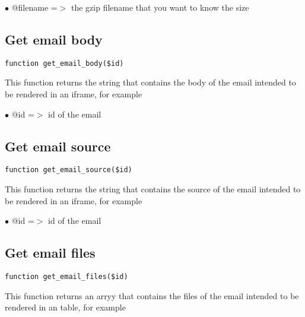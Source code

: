 \documentclass[a4paper]{book}
\begin{document}
\begin{compactitem}
\item[\color{myblue}$\bullet$] @filename =$>$ the gzip filename that you want to know the size
\end{compactitem}

\hypertarget{toc554}{}
\subsection{Get email body}

\begin{lstlisting}
function get_email_body($id)
\end{lstlisting}

This function returns the string that contains the body of the email
intended to be rendered in an iframe, for example

\begin{compactitem}
\item[\color{myblue}$\bullet$] @id =$>$ id of the email
\end{compactitem}

\hypertarget{toc555}{}
\subsection{Get email source}

\begin{lstlisting}
function get_email_source($id)
\end{lstlisting}

This function returns the string that contains the source of the email
intended to be rendered in an iframe, for example

\begin{compactitem}
\item[\color{myblue}$\bullet$] @id =$>$ id of the email
\end{compactitem}

\hypertarget{toc556}{}
\subsection{Get email files}

\begin{lstlisting}
function get_email_files($id)
\end{lstlisting}

This function returns an arryy that contains the files of the email
intended to be rendered in an table, for example
\end{document}
